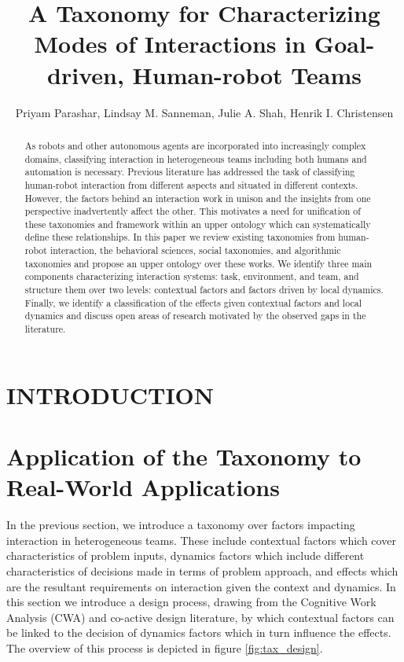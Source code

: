 \documentclass[letterpaper, 10 pt, conference]{ieeeconf}  %
\title{\LARGE \bf
A Taxonomy for Characterizing Modes of Interactions in Goal-driven, Human-robot Teams
}
\author{
Priyam Parashar, Lindsay M. Sanneman, Julie A. Shah, Henrik I. Christensen
}
\theoremstyle{definition}
\begin{document}
\maketitle
\thispagestyle{empty}
\pagestyle{empty}


\begin{abstract}

As robots and other autonomous agents are incorporated into increasingly complex domains, classifying interaction in heterogeneous teams including both humans and automation is necessary. Previous literature has addressed the task of classifying human-robot interaction from different aspects and situated in different contexts. However, the factors behind an interaction work in unison and the insights from one perspective inadvertently affect the other. This motivates a need for unification of these taxonomies and framework within an upper ontology which can systematically define these relationships. In this paper we review existing taxonomies from human-robot interaction, the behavioral sciences, social taxonomies, and algorithmic taxonomies and propose an upper ontology over these works. We identify three main components characterizing interaction systems: task, environment, and team, and structure them over two levels: contextual factors and factors driven by local dynamics. Finally, we identify a classification of the effects given contextual factors and local dynamics and discuss open areas of research motivated by the observed gaps in the literature. 

\end{abstract}



\section{INTRODUCTION}

\section{Application of the Taxonomy to Real-World Applications}
In the previous section, we introduce a taxonomy over factors impacting interaction in heterogeneous teams. These include contextual factors which cover characteristics of problem inputs, dynamics factors which include different characteristics of decisions made in terms of problem approach, and effects which are the resultant requirements on interaction given the context and dynamics. In this section we introduce a design process, drawing from the Cognitive Work Analysis (CWA) and co-active design literature, by which contextual factors can be linked to the decision of dynamics factors which in turn influence the effects. The overview of this process is depicted in figure \ref{fig:tax_design}. 
\end{document}

